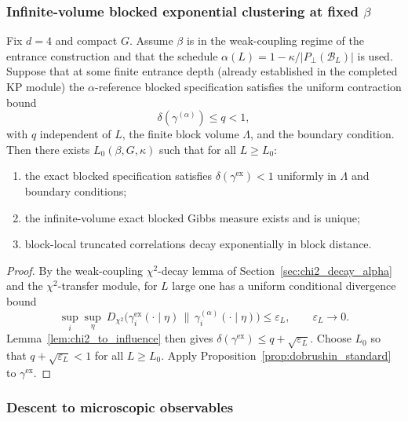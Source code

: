 \subsubsection{Infinite-volume blocked exponential clustering at fixed \texorpdfstring{$\beta$}{beta}}

\begin{theorem}\label{thm:blocked_iv_clustering}
Fix $d=4$ and compact $G$. Assume $\beta$ is in the weak-coupling regime of the entrance construction and
that the schedule $\alpha(L)=1-\kappa/|P_\perp(\mathcal B_L)|$ is used.
Suppose that at some finite entrance depth (already established in the completed KP module) the $\alpha$-reference
blocked specification satisfies the uniform contraction bound
\[
\delta(\gamma^{(\alpha)})\le q <1,
\]
with $q$ independent of $L$, the finite block volume $\Lambda$, and the boundary condition.
Then there exists $L_0(\beta,G,\kappa)$ such that for all $L\ge L_0$:
\begin{enumerate}[leftmargin=*]
\item the exact blocked specification satisfies $\delta(\gamma^{\mathrm{ex}})<1$ uniformly in $\Lambda$ and boundary conditions;
\item the infinite-volume exact blocked Gibbs measure exists and is unique;
\item block-local truncated correlations decay exponentially in block distance.
\end{enumerate}
\end{theorem}

\begin{proof}
By the weak-coupling $\chi^2$-decay lemma of Section~\ref{sec:chi2_decay_alpha} and the $\chi^2$-transfer module,
for $L$ large one has a uniform conditional divergence bound
\[
\sup_i\sup_\eta\ D_{\chi^2}\bigl(\gamma_i^{\mathrm{ex}}(\cdot\mid\eta)\,\|\,\gamma_i^{(\alpha)}(\cdot\mid\eta)\bigr)
\le \varepsilon_L,\qquad \varepsilon_L\to 0.
\]
Lemma~\ref{lem:chi2_to_influence} then gives $\delta(\gamma^{\mathrm{ex}})\le q+\sqrt{\varepsilon_L}$.
Choose $L_0$ so that $q+\sqrt{\varepsilon_L}<1$ for all $L\ge L_0$.
Apply Proposition~\ref{prop:dobrushin_standard} to $\gamma^{\mathrm{ex}}$.
\end{proof}

\subsubsection{Descent to microscopic observables}

